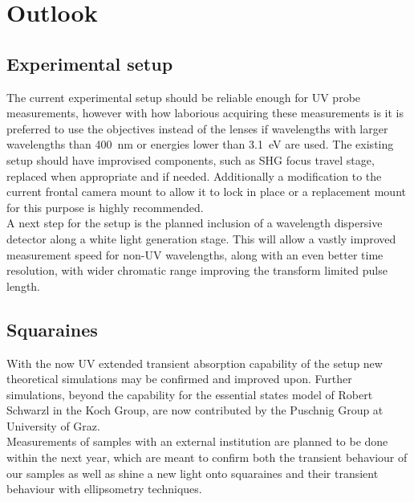 \documentclass[twoside,openright,listof=numbered]{scrreprt}
\begin{document}
\chapter{Outlook}
\section{Experimental setup}
The current experimental setup should be reliable enough for UV probe measurements, however with how laborious acquiring these measurements is it is preferred to use the objectives instead of the lenses if wavelengths with larger wavelengths than \qty{400}{\nano\meter} or energies lower than \qty{3.1}{\electronvolt} are used. The existing setup should have improvised components, such as SHG focus travel stage, replaced when appropriate and if needed. Additionally a modification to the current frontal camera mount to allow it to lock in place or a replacement mount for this purpose is highly recommended.\\
A next step for the setup is the planned inclusion of a wavelength dispersive detector along a white light generation stage. This will allow a vastly improved measurement speed for non-UV wavelengths, along with an even better time resolution, with wider chromatic range improving the transform limited pulse length.

\section{Squaraines}
With the now UV extended transient absorption capability of the setup new theoretical simulations may be confirmed and improved upon. Further simulations, beyond the capability for the essential states model of Robert Schwarzl in the Koch Group, are now contributed by the Puschnig Group at University of Graz.\\
Measurements of samples with an external institution are planned to be done within the next year, which are meant to confirm both the transient behaviour of our samples as well as shine a new light onto squaraines and their transient behaviour with ellipsometry techniques.


\setcounter{chapter}{0}
\renewcommand\thechapter{\Alph{chapter}}
\end{document}
